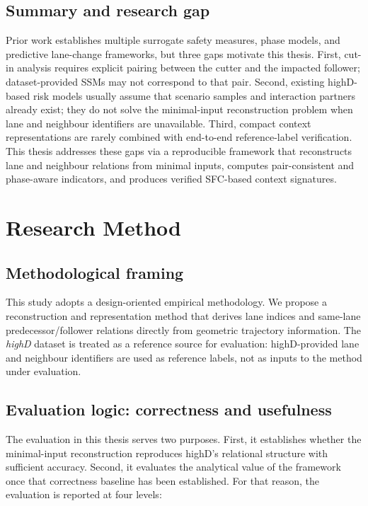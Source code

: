 \documentclass[12pt,a4paper,twoside,openright]{report}
\begin{document}
    \section{Summary and research gap}
    Prior work establishes multiple surrogate safety measures, phase models, and predictive lane-change frameworks, but three gaps motivate this thesis. First, cut-in analysis requires explicit pairing between the cutter and the impacted follower; dataset-provided SSMs may not correspond to that pair. Second, existing highD-based risk models usually assume that scenario samples and interaction partners already exist; they do not solve the minimal-input reconstruction problem when lane and neighbour identifiers are unavailable. Third, compact context representations are rarely combined with end-to-end reference-label verification. This thesis addresses these gaps via a reproducible framework that reconstructs lane and neighbour relations from minimal inputs, computes pair-consistent and phase-aware indicators, and produces verified SFC-based context signatures.

    \chapter{Research Method}
    \label{chap:researchmethod}

    \section{Methodological framing}
    This study adopts a design-oriented empirical methodology. We propose a reconstruction and representation method that derives lane indices and same-lane predecessor/follower relations directly from geometric trajectory information. The \textit{highD} dataset is treated as a reference source for evaluation: highD-provided lane and neighbour identifiers are used as reference labels, not as inputs to the method under evaluation.

    \section{Evaluation logic: correctness and usefulness}
    The evaluation in this thesis serves two purposes. First, it establishes whether the minimal-input reconstruction reproduces highD's relational structure with sufficient accuracy. Second, it evaluates the analytical value of the framework once that correctness baseline has been established. For that reason, the evaluation is reported at four levels:
\end{document}
